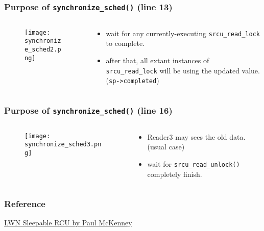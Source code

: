 \documentclass{beamer}
\begin{document}
\begin{frame}[t]
  \frametitle{Purpose of \texttt{synchronize\_sched()} (line 13)}

  \begin{columns}
    \begin{column}{.4\textwidth}
      \begin{figure}[ht]
        \centering
        \texttt{[image: synchronize\_sched2.png]}
      \end{figure}
    \end{column}

    \begin{column}{.6\textwidth}
      \begin{itemize}
      \item wait for any currently-executing \texttt{srcu\_read\_lock} to complete.
      \item after that, all extant instances of \texttt{srcu\_read\_lock} will be using
        the updated value. (\texttt{sp->completed})
      \end{itemize}
    \end{column}
  \end{columns}
  
\end{frame}


\begin{frame}[t]
  \frametitle{Purpose of \texttt{synchronize\_sched()} (line 16)}

  \begin{columns}
    \begin{column}{.4\textwidth}
      \begin{figure}[ht]
        \centering
        \texttt{[image: synchronize\_sched3.png]}
      \end{figure}
    \end{column}

    \begin{column}{.6\textwidth}
      \begin{itemize}
      \item Reader3 may sees the old data. (usual case)
      \item wait for \texttt{srcu\_read\_unlock()} completely finish.
      \end{itemize}
    \end{column}
  \end{columns}
  
\end{frame}


\begin{frame}[t]
  \frametitle{Reference}
  \href{https://lwn.net/Articles/202847/}{LWN Sleepable RCU by Paul McKenney}
  
\end{frame}
\end{document}
